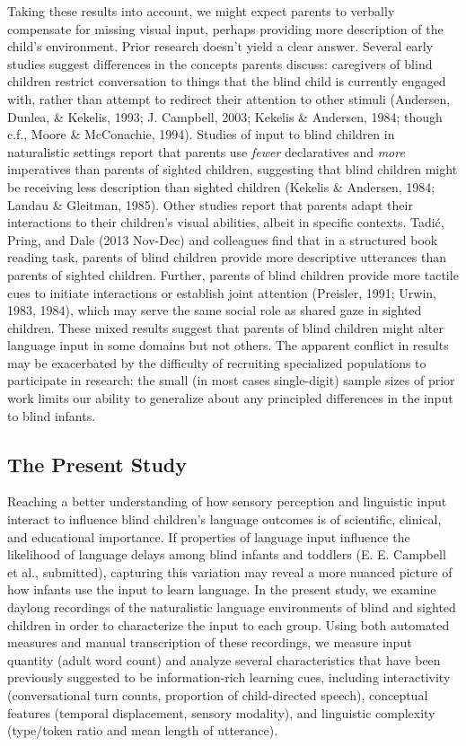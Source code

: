 \documentclass[
  man,floatsintext]{apa6}
\begin{document}
Taking these results into account, we might expect parents to verbally compensate for missing visual input, perhaps providing more description of the child's environment. Prior research doesn't yield a clear answer. Several early studies suggest differences in the concepts parents discuss: caregivers of blind children restrict conversation to things that the blind child is currently engaged with, rather than attempt to redirect their attention to other stimuli (Andersen, Dunlea, \& Kekelis, 1993; J. Campbell, 2003; Kekelis \& Andersen, 1984; though c.f., Moore \& McConachie, 1994). Studies of input to blind children in naturalistic settings report that parents use \emph{fewer} declaratives and \emph{more} imperatives than parents of sighted children, suggesting that blind children might be receiving less description than sighted children (Kekelis \& Andersen, 1984; Landau \& Gleitman, 1985). Other studies report that parents adapt their interactions to their children's visual abilities, albeit in specific contexts. Tadić, Pring, and Dale (2013 Nov-Dec) and colleagues find that in a structured book reading task, parents of blind children provide more descriptive utterances than parents of sighted children. Further, parents of blind children provide more tactile cues to initiate interactions or establish joint attention (Preisler, 1991; Urwin, 1983, 1984), which may serve the same social role as shared gaze in sighted children. These mixed results suggest that parents of blind children might alter language input in some domains but not others. The apparent conflict in results may be exacerbated by the difficulty of recruiting specialized populations to participate in research: the small (in most cases single-digit) sample sizes of prior work limits our ability to generalize about any principled differences in the input to blind infants.

\hypertarget{the-present-study}{%
\subsection{The Present Study}\label{the-present-study}}

Reaching a better understanding of how sensory perception and linguistic input interact to influence blind children's language outcomes is of scientific, clinical, and educational importance. If properties of language input influence the likelihood of language delays among blind infants and toddlers (E. E. Campbell et al., submitted), capturing this variation may reveal a more nuanced picture of how infants use the input to learn language. In the present study, we examine daylong recordings of the naturalistic language environments of blind and sighted children in order to characterize the input to each group. Using both automated measures and manual transcription of these recordings, we measure input quantity (adult word count) and analyze several characteristics that have been previously suggested to be information-rich learning cues, including interactivity (conversational turn counts, proportion of child-directed speech), conceptual features (temporal displacement, sensory modality), and linguistic complexity (type/token ratio and mean length of utterance).
\end{document}
